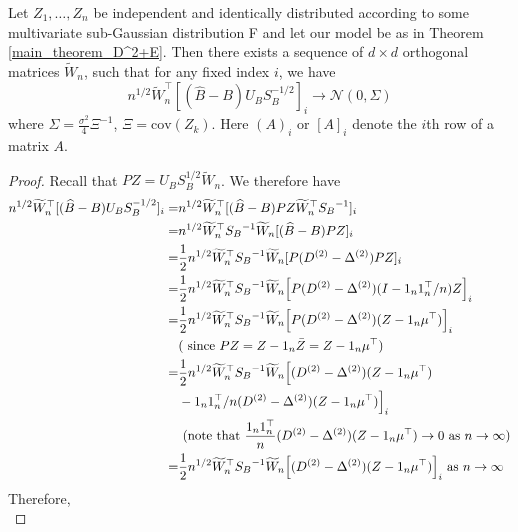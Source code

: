 \begin{lemma}
\label{cov_D^2+E}
  Let $Z_1, \dots, Z_n$ be independent and identically distributed according to some multivariate sub-Gaussian distribution F and let our model be as in Theorem \ref{main_theorem_D^2+E}. Then there exists a sequence of $d \times d$ orthogonal matrices $\tilde{W}_n$, such that for any fixed index $i$, we have
  $$ n^{1/2} \tilde{W}_n^{\top} [(\hat{B} - B) U_B S_B^{-1/2}]_{i} \longrightarrow \mathcal{N}(0, \Sigma)$$
  where $\Sigma  = \frac{\sigma^2}{4} {\Xi}^{-1}$, 
  $\Xi = \mathrm{cov} (Z_k)$. Here $(A)_i$ or $[A]_i$ denote the $i$th row of a matrix $A$. 
\end{lemma}
\begin{proof}
 Recall that $PZ = U_B S_B^{1/2} \tilde{W}_n $. We therefore have
    \begin{align*}
        n^{1/2} \tilde{W}_n^\top [(\hat{B} - B) U_B S_B^{-1/2}]_{i}
         = & n^{1/2} \tilde{W}_n^\top [(\hat{B} - B) PZ \tilde{W}_n^\top {S_B}^{-1}]_{i} \\
         = & n^{1/2} \tilde{W}_n^\top {S_B}^{-1} \tilde{W}_n [(\hat{B} - B)PZ]_{i}\\
         = & \frac{1}{2} n^{1/2} \tilde{W}_n^\top {S_B}^{-1} \tilde{W}_n [P (D^{(2)}  - \Delta^{(2)}) PZ]_{i}\\
         = & \frac{1}{2} n^{1/2} \tilde{W}_n^\top {S_B}^{-1} \tilde{W}_n \Bigl[ P (D^{(2)}  - \Delta^{(2)}) (I - 1_n 1_n^\top/n)Z\Bigr]_{i} \\
         = & \frac{1}{2} n^{1/2} \tilde{W}_n^\top {S_B}^{-1} \tilde{W}_n \Bigl[ P (D^{(2)}  - \Delta^{(2)}) (Z - 1_n \mu^\top) \Bigr]_{i} \\
        & \textrm{( since } PZ = Z - 1_n \bar{Z} = Z - 1_n \mu^{\top} )\\
         = &  \frac{1}{2} n^{1/2} \tilde{W}_n^\top {S_B}^{-1} \tilde{W}_n \Bigl[  (D^{(2)} - \Delta^{(2)})(Z - 1_n \mu^\top ) \\
        & -  1_n 1_n^\top/n (D^{(2)} - \Delta^{(2)}) (Z - 1_n \mu^\top)    \Bigl]_{i}    \\
        & \textrm{ (note that } \frac{1_n 1_n^\top}{n} (D^{(2)} - \Delta^{(2)}) (Z - 1_n \mu^\top) \rightarrow 0 \textrm{ as } n \rightarrow \infty) \\
        = &  \frac{1}{2} n^{1/2} \tilde{W}_n^\top {S_B}^{-1} \tilde{W}_n \Bigl[ (D^{(2)} - \Delta^{(2)})(Z - 1_n \mu^\top ) \Bigl]_{i}  \textrm{ as } n \rightarrow \infty
    \end{align*} 
Therefore,
    \begin{equation*}

\end{equation*}
\end{proof}
